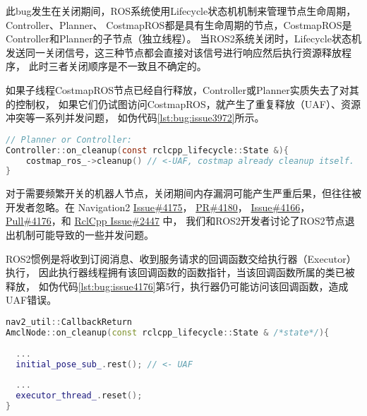 此bug发生在关闭期间，ROS系统使用Lifecycle状态机机制来管理节点生命周期，Controller、Planner、
CostmapROS都是具有生命周期的节点，CostmapROS是Controller和Planner的子节点（独立线程）。
当ROS2系统关闭时，Lifecycle状态机发送同一关闭信号，这三种节点都会直接对该信号进行响应然后执行资源释放程序，
此时三者关闭顺序是不一致且不确定的。

如果子线程CostmapROS节点已经自行释放，Controller或Planner实质失去了对其的控制权，
如果它们仍试图访问CostmapROS，就产生了重复释放（UAF）、资源冲突等一系列并发问题，
如伪代码\ref{lst:bug:issue3972}所示。

\begin{lstlisting}[language=C, caption=漏洞\#3972问题代码, label=lst:bug:issue3972]
// Planner or Controller:
Controller::on_cleanup(const rclcpp_lifecycle::State &){
	costmap_ros_->cleanup() // <-UAF, costmap already cleanup itself.
}
\end{lstlisting}

对于需要频繁开关的机器人节点，关闭期间内存漏洞可能产生严重后果，但往往被开发者忽略。在 Navigation2 
\href{https://github.com/ros-planning/navigation2/issues/4175}{Issue\#4175}，
\href{https://github.com/ros-planning/navigation2/pull/4180}{PR\#4180}，
\href{https://github.com/ros-planning/navigation2/issues/4166}{Issue\#4166}，
\href{https://github.com/ros-planning/navigation2/pull/4176}{Pull\#4176}，和 
\href{https://github.com/ros2/rclcpp/issues/2447}{RclCpp Issue\#2447} 中，
我们和ROS2开发者讨论了ROS2节点退出机制可能导致的一些并发问题。

ROS2惯例是将收到订阅消息、收到服务请求的回调函数交给执行器（Executor）执行，
因此执行器线程拥有该回调函数的函数指针，当该回调函数所属的类已被释放，
如伪代码\ref{lst:bug:issue4176}第5行，执行器仍可能访问该回调函数，造成UAF错误。

\begin{lstlisting}[language=C++, caption=漏洞\#4176问题代码, label=lst:bug:issue4176]
nav2_util::CallbackReturn
AmclNode::on_cleanup(const rclcpp_lifecycle::State & /*state*/){
  
  ...
  initial_pose_sub_.rest(); // <- UAF
  
  ...
  executor_thread_.reset();
}

\end{lstlisting}

